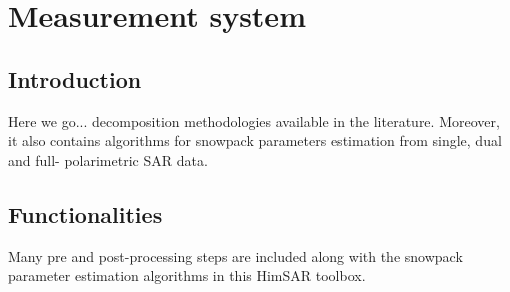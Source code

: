\chapter{Measurement system}

\section{Introduction}
Here we go... decomposition methodologies available in the literature. Moreover, it also contains algorithms for snowpack parameters estimation from single, dual and full- polarimetric SAR data. 

\section{Functionalities}
Many pre and post-processing steps are included along with the snowpack parameter estimation algorithms in this HimSAR toolbox.